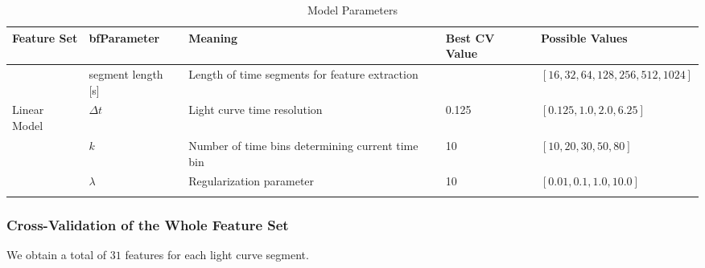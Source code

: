 \documentclass[12pt]{emulateapj}
\begin{document}
\begin{table*}[hbtp]
\renewcommand{\arraystretch}{1.3}
\footnotesize
\caption{Model Parameters}
\begin{threeparttable} 
\begin{tabularx}{\textwidth}{p{2.0cm}p{10.0cm}X}%
\toprule
\bf{Feature Set} & bf{Parameter} & \bf{Meaning} & Best CV Value &  \bf{Possible Values} \\ \midrule
 & segment length [s] & Length of time segments for feature extraction &  &$[16, 32, 64, 128, 256, 512, 1024]$ \\
 Linear Model & $\Delta t$ & Light curve time resolution & 0.125 & $[0.125, 1.0, 2.0, 6.25]$ \\
		& $k$ & Number of time bins determining current time bin & 10 & $[10, 20, 30, 50, 80]$ \\
		& $\lambda$ & Regularization parameter & 10 & $[0.01, 0.1, 1.0, 10.0]$ \\ \midrule



  \\\bottomrule
\end{tabularx}
   \begin{tablenotes}
      \item{}
\end{tablenotes}
\end{threeparttable}
\label{tab:priortable}
\end{table*}


\subsubsection{Cross-Validation of the Whole Feature Set}

We obtain a total of $31$ features for each light curve segment. 
\end{document}
